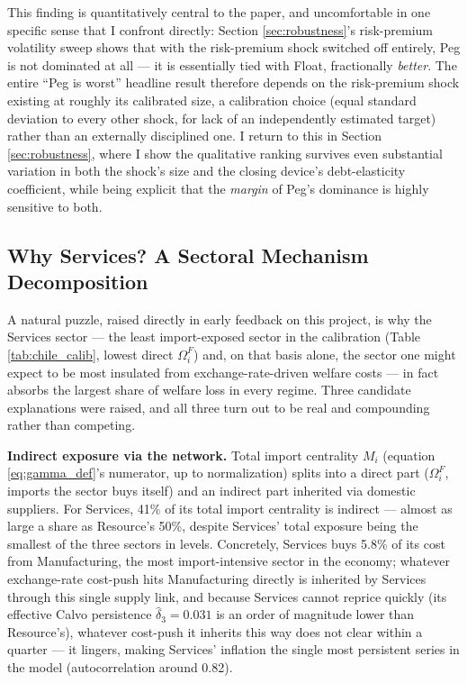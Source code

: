 \documentclass[12pt]{article}
\begin{document}
This finding is quantitatively central to the paper, and uncomfortable in one specific sense that I
confront directly: Section \ref{sec:robustness}'s risk-premium volatility sweep shows that with the
risk-premium shock switched off entirely, Peg is not dominated at all --- it is essentially tied with
Float, fractionally \emph{better}. The entire ``Peg is worst'' headline result therefore depends on
the risk-premium shock existing at roughly its calibrated size, a calibration choice (equal standard
deviation to every other shock, for lack of an independently estimated target) rather than an
externally disciplined one. I return to this in Section \ref{sec:robustness}, where I show the
qualitative ranking survives even substantial variation in both the shock's size and the closing
device's debt-elasticity coefficient, while being explicit that the \emph{margin} of Peg's dominance
is highly sensitive to both.

\subsection{Why Services? A Sectoral Mechanism Decomposition}
\label{sec:why_services}

A natural puzzle, raised directly in early feedback on this project, is why the Services sector ---
the least import-exposed sector in the calibration (Table \ref{tab:chile_calib}, lowest direct
$\Omega^F_i$) and, on that basis alone, the sector one might expect to be most insulated from
exchange-rate-driven welfare costs --- in fact absorbs the largest share of welfare loss in every
regime. Three candidate explanations were raised, and all three turn out to be real and compounding
rather than competing.

\textbf{Indirect exposure via the network.} Total import centrality $M_i$ (equation
\eqref{eq:gamma_def}'s numerator, up to normalization) splits into a direct part ($\Omega^F_i$, imports
the sector buys itself) and an indirect part inherited via domestic suppliers. For Services, 41\% of
its total import centrality is indirect --- almost as large a share as Resource's 50\%, despite
Services' total exposure being the smallest of the three sectors in levels. Concretely, Services buys
5.8\% of its cost from Manufacturing, the most import-intensive sector in the economy; whatever
exchange-rate cost-push hits Manufacturing directly is inherited by Services through this single
supply link, and because Services cannot reprice quickly (its effective Calvo persistence
$\hat\delta_3=0.031$ is an order of magnitude lower than Resource's), whatever cost-push it inherits
this way does not clear within a quarter --- it lingers, making Services' inflation the single most
persistent series in the model (autocorrelation around 0.82).
\end{document}
